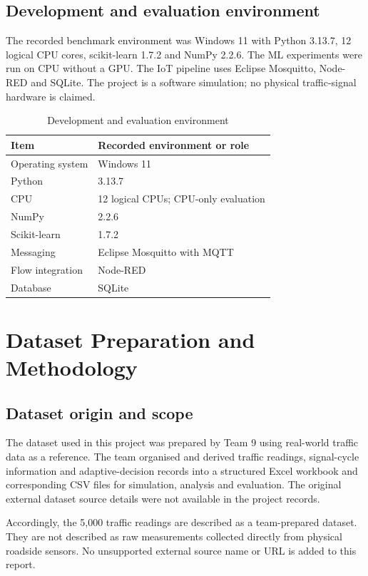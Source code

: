 \documentclass[12pt,a4paper,oneside]{report}
\begin{document}
\section{Development and evaluation environment}
The recorded benchmark environment was Windows 11 with Python 3.13.7, 12 logical CPU cores, scikit-learn 1.7.2 and NumPy 2.2.6. The ML experiments were run on CPU without a GPU. The IoT pipeline uses Eclipse Mosquitto, Node-RED and SQLite. The project is a software simulation; no physical traffic-signal hardware is claimed.

\begin{table}[htbp]\centering\small
\caption{Development and evaluation environment}\label{tab:environment}
\begin{tabular}{|p{}|p{}|}\hline
\textbf{Item} & \textbf{Recorded environment or role} \\\hline
Operating system & Windows 11 \\\hline
Python & 3.13.7 \\\hline
CPU & 12 logical CPUs; CPU-only evaluation \\\hline
NumPy & 2.2.6 \\\hline
Scikit-learn & 1.7.2 \\\hline
Messaging & Eclipse Mosquitto with MQTT \\\hline
Flow integration & Node-RED \\\hline
Database & SQLite \\\hline
\end{tabular}\end{table}

\clearpage
\chapter{Dataset Preparation and Methodology}
\section{Dataset origin and scope}
The dataset used in this project was prepared by Team 9 using real-world traffic data as a reference. The team organised and derived traffic readings, signal-cycle information and adaptive-decision records into a structured Excel workbook and corresponding CSV files for simulation, analysis and evaluation. The original external dataset source details were not available in the project records.

Accordingly, the 5,000 traffic readings are described as a team-prepared dataset. They are not described as raw measurements collected directly from physical roadside sensors. No unsupported external source name or URL is added to this report.
\end{document}
